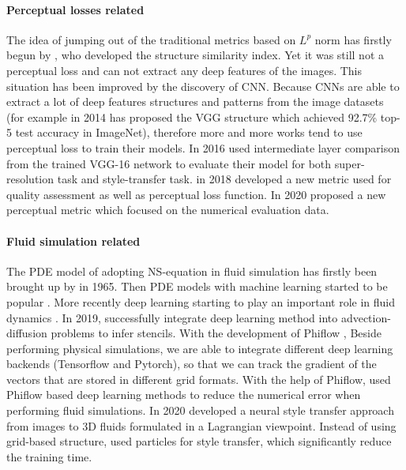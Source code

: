 \documentclass[a4paper,12pt,twoside]{report}
\begin{document}
\paragraph{Perceptual losses related}The idea of jumping out of the traditional metrics based on $L^p$ norm has firstly begun by \cite{wang2004}, who developed the structure similarity index. Yet it was still not a perceptual loss and can not extract any deep features of the images. This situation has been improved by the discovery of CNN. Because CNNs are able to extract a lot of deep features structures and patterns from the image datasets (for example in 2014 \cite{simonyan2014very} has proposed the VGG structure which achieved 92.7\% top-5 test accuracy in ImageNet), therefore more and more  works tend to use perceptual loss to train their models\cite{amirshahi2016, berardino2017, bosse2016, kang2014, kim2017}. In 2016 \cite{johnson2016perceptual} used intermediate layer comparison from the trained VGG-16 network to evaluate their model for both super-resolution task and style-transfer task.  in 2018 \cite{zhang2018perceptual} developed a new metric used for quality assessment as well as perceptual loss function. In 2020 \cite{kohl2020learning} proposed a new perceptual metric which focused on the numerical evaluation data.

\paragraph{Fluid simulation related}The PDE model of adopting NS-equation in fluid simulation has firstly been brought up by \cite{doi:10.1063/1.1761178} in 1965. Then PDE models with machine learning started to be popular \cite{crutchfield1987equations,kevrekidis2003equation,brunton2016discovering}. More recently deep learning starting to play an important role in fluid dynamics \cite{kutz2017}. In 2019, \citeauthor{barsinai2019data} successfully integrate deep learning method into advection-diffusion problems to infer stencils. With the development of Phiflow \cite{holl2020learning}, Beside performing physical simulations, we are able to integrate different deep learning backends (Tensorflow and Pytorch), so that we can track the gradient of the vectors that are stored in different grid formats. With the help of Phiflow, \cite{um2020sol} used Phiflow based deep learning methods to reduce the numerical error when performing fluid simulations. In 2020 \citeauthor{kim2020lagrangian} developed a neural style transfer approach from images to 3D fluids formulated in a Lagrangian viewpoint. Instead of using grid-based structure, \citeauthor{kim2020lagrangian} used particles for style transfer, which significantly reduce the training time.
\end{document}
